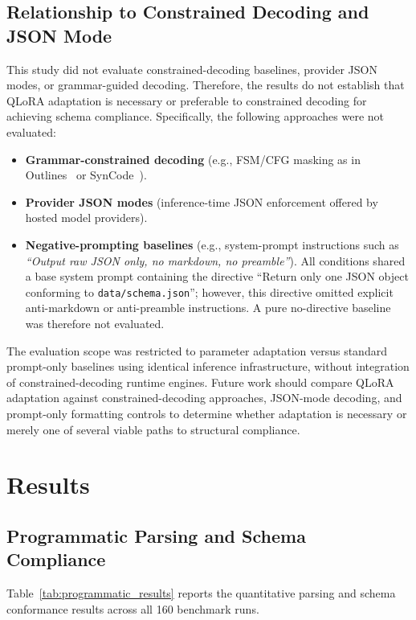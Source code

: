 \documentclass[11pt,a4paper]{article}
\begin{document}
\subsection{Relationship to Constrained Decoding and JSON Mode}
\label{sec:constrained-decoding}
This study did not evaluate constrained-decoding baselines, provider JSON modes, or grammar-guided decoding. Therefore, the results do not establish that QLoRA adaptation is necessary or preferable to constrained decoding for achieving schema compliance. Specifically, the following approaches were not evaluated:
\begin{itemize}
    \item \textbf{Grammar-constrained decoding} (e.g., FSM/CFG masking as in Outlines~\cite{willard2023guided} or SynCode~\cite{ugare2025syncode}).
    \item \textbf{Provider JSON modes} (inference-time JSON enforcement offered by hosted model providers).
    \item \textbf{Negative-prompting baselines} (e.g., system-prompt instructions such as \textit{``Output raw JSON only, no markdown, no preamble''}). All conditions shared a base system prompt containing the directive ``Return only one JSON object conforming to \texttt{data/schema.json}''; however, this directive omitted explicit anti-markdown or anti-preamble instructions. A pure no-directive baseline was therefore not evaluated.
\end{itemize}
The evaluation scope was restricted to parameter adaptation versus standard prompt-only baselines using identical inference infrastructure, without integration of constrained-decoding runtime engines. Future work should compare QLoRA adaptation against constrained-decoding approaches, JSON-mode decoding, and prompt-only formatting controls to determine whether adaptation is necessary or merely one of several viable paths to structural compliance.

\section{Results}

\subsection{Programmatic Parsing and Schema Compliance}

Table~\ref{tab:programmatic_results} reports the quantitative parsing and schema conformance results across all 160 benchmark runs.
\end{document}
